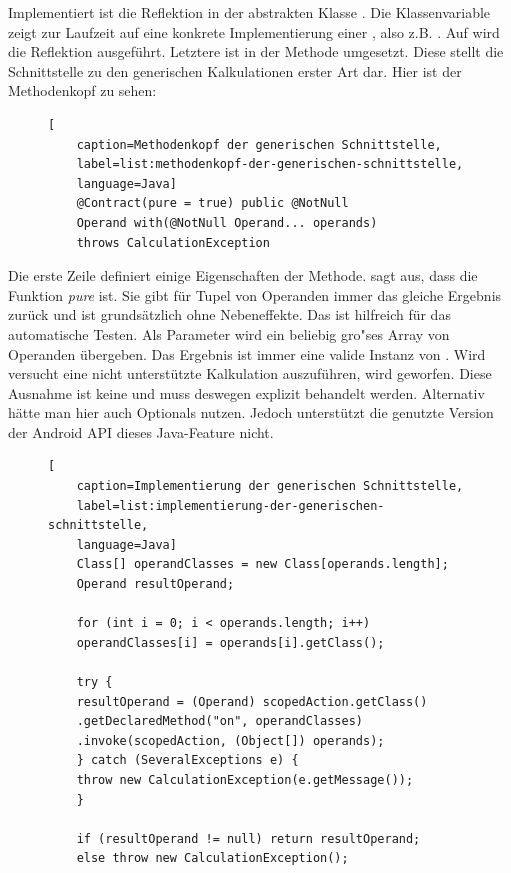 Implementiert ist die Reflektion in der abstrakten Klasse . Die Klassenvariable  zeigt zur Laufzeit auf eine konkrete Implementierung einer , also z.B. . Auf  wird die Reflektion ausgeführt. Letztere ist in der Methode  umgesetzt. Diese stellt die Schnittstelle zu den generischen Kalkulationen erster Art dar. Hier ist der Methodenkopf zu sehen:

\begin{figure}[bht]
	\begin{lstlisting}[
	caption=Methodenkopf der generischen Schnittstelle,
	label=list:methodenkopf-der-generischen-schnittstelle,
	language=Java]
	@Contract(pure = true) public @NotNull 
	Operand with(@NotNull Operand... operands) 
	throws CalculationException
	\end{lstlisting}    
\end{figure}

Die erste Zeile definiert einige Eigenschaften der Methode.  sagt aus, dass die Funktion \textit{pure} ist. Sie gibt für Tupel von Operanden immer das gleiche Ergebnis zurück und ist grundsätzlich ohne Nebeneffekte. Das ist hilfreich für das automatische Testen. Als Parameter wird ein beliebig gro"ses Array von Operanden übergeben. Das Ergebnis ist immer eine valide Instanz von . Wird versucht eine nicht unterstützte Kalkulation auszuführen, wird  geworfen. Diese Ausnahme ist keine  und muss deswegen explizit behandelt werden. Alternativ hätte man hier auch Optionals nutzen. Jedoch unterstützt die genutzte Version der Android API dieses Java-Feature nicht.

\begin{figure}[bht]
	\begin{lstlisting}[
	caption=Implementierung der generischen Schnittstelle,
	label=list:implementierung-der-generischen-schnittstelle,
	language=Java]
	Class[] operandClasses = new Class[operands.length];
	Operand resultOperand;
	
	for (int i = 0; i < operands.length; i++)
	operandClasses[i] = operands[i].getClass();
	
	try {
	resultOperand = (Operand) scopedAction.getClass()
	.getDeclaredMethod("on", operandClasses)
	.invoke(scopedAction, (Object[]) operands);
	} catch (SeveralExceptions e) {
	throw new CalculationException(e.getMessage());
	}
	
	if (resultOperand != null) return resultOperand;
	else throw new CalculationException();
	\end{lstlisting}    
\end{figure}

